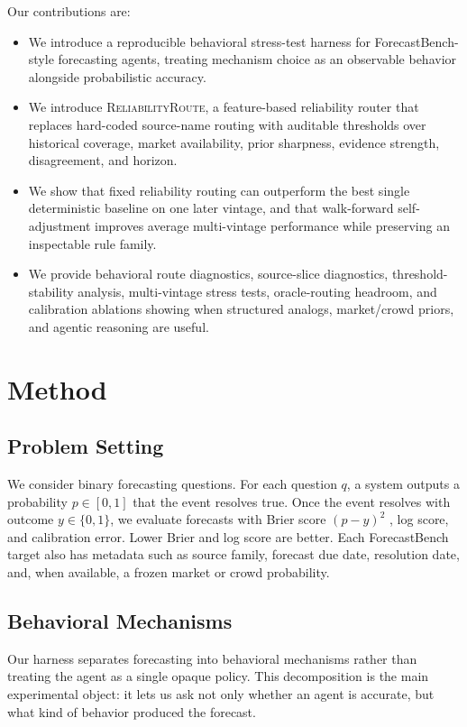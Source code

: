 \documentclass{article}
\newcommand{\rel}{\textsc{ReliabilityRoute}}
\begin{document}
Our contributions are:
\begin{itemize}
    \item We introduce a reproducible behavioral stress-test harness for ForecastBench-style forecasting agents, treating mechanism choice as an observable behavior alongside probabilistic accuracy.
    \item We introduce \rel{}, a feature-based reliability router that replaces hard-coded source-name routing with auditable thresholds over historical coverage, market availability, prior sharpness, evidence strength, disagreement, and horizon.
    \item We show that fixed reliability routing can outperform the best single deterministic baseline on one later vintage, and that walk-forward self-adjustment improves average multi-vintage performance while preserving an inspectable rule family.
    \item We provide behavioral route diagnostics, source-slice diagnostics, threshold-stability analysis, multi-vintage stress tests, oracle-routing headroom, and calibration ablations showing when structured analogs, market/crowd priors, and agentic reasoning are useful.
\end{itemize}

\section{Method}
\label{sec:method}

\subsection{Problem Setting}

We consider binary forecasting questions. For each question $q$, a system outputs a probability $p \in [0,1]$ that the event resolves true. Once the event resolves with outcome $y \in \{0,1\}$, we evaluate forecasts with Brier score $(p-y)^2$ \citep{brier1950verification}, log score, and calibration error. Lower Brier and log score are better. Each ForecastBench target also has metadata such as source family, forecast due date, resolution date, and, when available, a frozen market or crowd probability.

\subsection{Behavioral Mechanisms}

Our harness separates forecasting into behavioral mechanisms rather than treating the agent as a single opaque policy. This decomposition is the main experimental object: it lets us ask not only whether an agent is accurate, but what kind of behavior produced the forecast.
\end{document}
